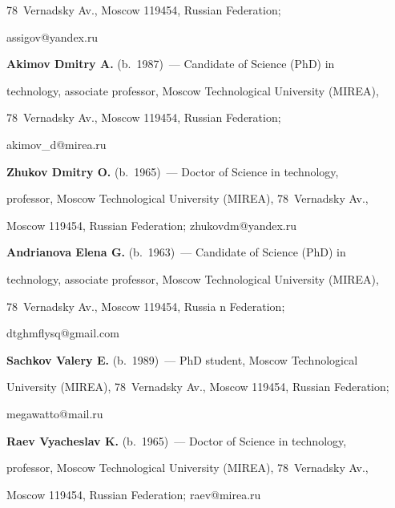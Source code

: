 78~Vernadsky Av., Moscow 119454, Russian Federation; 

\mbox{assigov@yandex.ru}



\vspace*{3pt}



\noindent

\textbf{Akimov Dmitry A.} (b.\ 1987)~--- Candidate of Science (PhD) in 

technology, associate professor, Moscow Technological University (MIREA), 

78~Vernadsky Av., Moscow 119454, Russian Federation; 

\mbox{akimov\_d@mirea.ru}



\vspace*{3pt}



\noindent

\textbf{Zhukov Dmitry O.} (b.\ 1965)~--- Doctor of Science in technology, 

professor, Moscow Technological University (MIREA), 78~Vernadsky Av., 

Moscow 119454, Russian Federation; \mbox{zhukovdm@yandex.ru}



\vspace*{3pt}



\noindent

\textbf{Andrianova Elena G.} (b.\ 1963)~--- Candidate of Science (PhD) in 

technology, associate professor, Moscow Technological University (MIREA), 

78~Vernadsky Av., Moscow 119454, Russia n Federation; 

\mbox{dtghmflysq@gmail.com}



\vspace*{3pt}



\noindent

\textbf{Sachkov Valery E.} (b.\ 1989)~--- PhD student, Moscow Technological 

University (MIREA), 78~Vernadsky Av., Moscow 119454, Russian Federation; 

\mbox{megawatto@mail.ru}



\vspace*{3pt}



\noindent

\textbf{Raev Vyacheslav K.} (b.\ 1965)~--- Doctor of Science in technology, 

professor, Moscow Technological University (MIREA), 78~Vernadsky Av., 

Moscow 119454, Russian Federation; \mbox{raev@mirea.ru}



\label{end\stat}





\renewcommand{\bibname}{\protect\rm Литература} 

  

